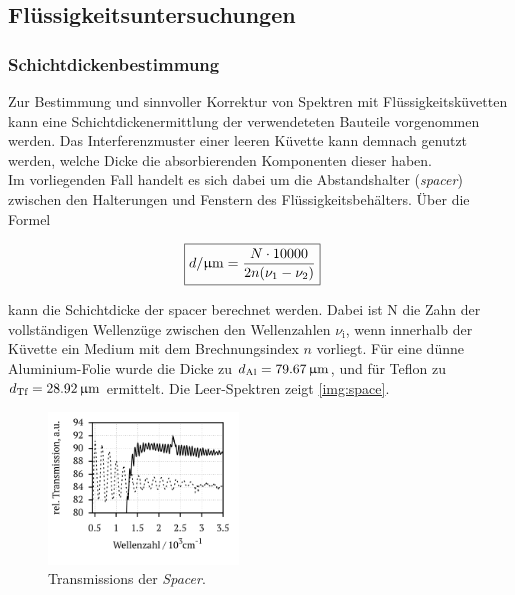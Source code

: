 \documentclass[a4paper,10pt,twocolumn]{article}
\newcommand{\ix}[1]{_\text{#1}}
\newcommand{\tilt}[1]{\textit{#1}}
\begin{document}
	\clearpage

		\subsection{Fl\"ussigkeitsuntersuchungen}

		\subsubsection{Schichtdickenbestimmung}

		Zur Bestimmung und sinnvoller Korrektur von Spektren mit Fl\"ussigkeitsk\"uvetten kann eine Schichtdickenermittlung der verwendeteten Bauteile vorgenommen werden. Das Interferenzmuster einer leeren K\"uvette kann demnach genutzt werden, welche Dicke die absorbierenden Komponenten dieser haben.\\
		Im vorliegenden Fall handelt es sich dabei um die Abstandshalter (\tilt{spacer}) zwischen den Halterungen und Fenstern des Fl\"ussigkeitsbeh\"alters. \"Uber die Formel
		
		\begin{align}
		\Aboxed{
			d/\unit{\upmu m}=\frac{N\cdot 10000}{2n(\nu\ix{1}-\nu\ix{2})}
			}
		\end{align}

		kann die Schichtdicke der spacer berechnet werden. Dabei ist N die Zahn der vollst\"andigen Wellenz\"uge zwischen den Wellenzahlen $\nu\ix{i}$, wenn innerhalb der K\"uvette ein Medium mit dem Brechnungsindex $n$ vorliegt. F\"ur eine d\"unne Aluminium-Folie wurde die Dicke zu $d\ix{Al}=\unit[79.67]{\upmu m}$, und f\"ur Teflon zu $d\ix{Tf}=\unit[28.92]{\upmu m}$ ermittelt. Die Leer-Spektren zeigt \autoref{img:space}.


	\begin{figure}[H]
		\centering
		\includegraphics[width=0.45\textwidth]{Gruppe2A/spacer.pdf}
		\caption{Transmissions der \tilt{Spacer}.}
		\label{img:space}
	\end{figure}

	\newpage
\end{document}
